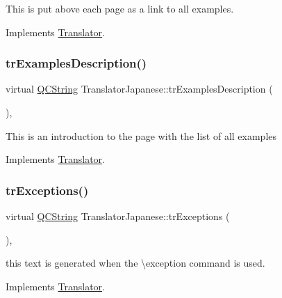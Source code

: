 This is put above each page as a link to all examples. 

Implements \mbox{\hyperlink{class_translator}{Translator}}.

\mbox{\label{class_translator_japanese_a64634d888eea387e1678d0c7fbd7e510}} 
\subsubsection{\texorpdfstring{trExamplesDescription()}{trExamplesDescription()}}
{\footnotesize\ttfamily virtual \mbox{\hyperlink{class_q_c_string}{Q\+C\+String}} Translator\+Japanese\+::tr\+Examples\+Description (\begin{DoxyParamCaption}{ }\end{DoxyParamCaption})\hspace{0.3cm}{\ttfamily [inline]}, {\ttfamily [virtual]}}

This is an introduction to the page with the list of all examples 

Implements \mbox{\hyperlink{class_translator}{Translator}}.

\mbox{\label{class_translator_japanese_a740f03ad885ee604d5b0b94c43711f05}} 
\subsubsection{\texorpdfstring{trExceptions()}{trExceptions()}}
{\footnotesize\ttfamily virtual \mbox{\hyperlink{class_q_c_string}{Q\+C\+String}} Translator\+Japanese\+::tr\+Exceptions (\begin{DoxyParamCaption}{ }\end{DoxyParamCaption})\hspace{0.3cm}{\ttfamily [inline]}, {\ttfamily [virtual]}}

this text is generated when the \textbackslash{}exception command is used. 

Implements \mbox{\hyperlink{class_translator}{Translator}}.

\mbox{\label{class_translator_japanese_a95ed5aea5be1a95219829cf0bd920b5a}} 
